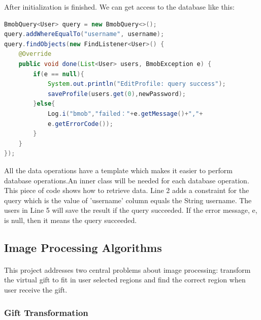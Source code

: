 \par After initialization is finished. We can get access to the database like this:
\begin{lstlisting}[language=JAVA] 
BmobQuery<User> query = new BmobQuery<>();
query.addWhereEqualTo("username", username);
query.findObjects(new FindListener<User>() {
    @Override
    public void done(List<User> users, BmobException e) {
        if(e == null){
            System.out.println("EditProfile: query success");
            saveProfile(users.get(0),newPassword);
        }else{
            Log.i("bmob","failed："+e.getMessage()+","+
            e.getErrorCode());
        }
    }
});
\end{lstlisting} 
\par All the data operations have a template which makes it easier to perform database operations.An inner class will be needed for each database operation. This piece of code shows how to retrieve data. Line 2 adds a constraint for the query which is the value of 'username' column equals the String username. The users in Line 5 will save the result if the query succeeded. If the error message, e, is null, then it means the query succeeded. 
\subsection{Image Processing Algorithms}
\paragraph{}This project addresses two central problems about image processing: transform the virtual gift to fit in user selected regions and find the correct region when user receive the gift. 

\subsubsection{Gift Transformation}
